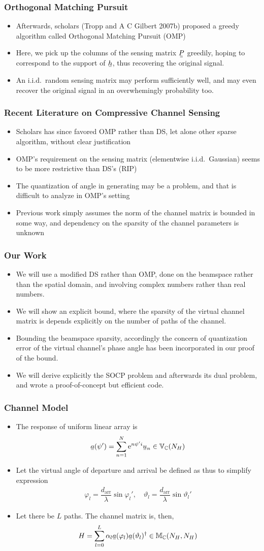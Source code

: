 \documentclass{beamer}
\newcommand{\Disp}[1]{\begin{align} #1 \end{align}}
\renewcommand{\H}{\dagger}
\newcommand{\f}{\varphi}
\renewcommand{\th}{\vartheta}
\newcommand{\I}{\item}
\newcommand{\MB}[1]{\mathbb{#1}}
\newcommand{\RM}[1]{\mathrm{#1}}
\newcommand{\V}[1]{\stackunder[1.2pt]{$#1$}{\rule{.9ex}{.075ex}}}
\newcommand{\M}[1]{\V{\V{#1}}}
\begin{document}
\begin{frame}
\frametitle{Orthogonal Matching Pursuit}
\begin{itemize}
\I Afterwards, scholars (Tropp and A C Gilbert 2007b) proposed a greedy algorithm called Orthogonal Matching Pursuit (OMP)
\I Here, we pick up the columns of the sensing matrix \(\M{P}\) greedily, hoping to correspond to the support of \(\V{h}\), thus recovering the original signal.
\I An i.i.d.\ random sensing matrix may perform sufficiently well, and may even recover the original signal in an overwhemingly probability too.
\end{itemize}
\end{frame}

\begin{frame}
\frametitle{Recent Literature on Compressive Channel Sensing}
\begin{itemize}
\I Scholars has since favored OMP rather than DS, let alone other sparse algorithm, without clear justification
\I OMP's requirement on the sensing matrix (elementwise i.i.d.\ Gaussian) seems to be more restrictive than DS's (RIP)
\I The quantization of angle in generating may be a problem, and that is difficult to analyze in OMP's setting
\I Previous work simply assumes the norm of the channel matrix is bounded in some way, and dependency on the sparsity of the channel parameters is unknown
\end{itemize}
\end{frame}

\begin{frame}
\frametitle{Our Work}
\begin{itemize}
\I We will use a modified DS rather than OMP, done on the beamspace rather than the spatial domain, and involving complex numbers rather than real numbers.
\I We will show an explicit bound, where the sparsity of the virtual channel matrix is depends explicitly on the number of paths of the channel.
\I Bounding the beamspace sparsity, accordingly the concern of quantization error of the virtual channel's phase angle has been incorporated in our proof of the bound.
\I We will derive explicitly the SOCP problem and afterwards its dual problem, and wrote a proof-of-concept but efficient code.
\end{itemize}
\end{frame}

\begin{frame}
\frametitle{Channel Model}
\begin{itemize}
\I The response of uniform linear array is
\Disp{
\V{a} (\psi')
=\sum_{n=1}^{N} \RM{e}^{n \psi' i} \V{u}_n
\in \MB{V}_\MB{C} (N_H)
}
\I Let the virtual angle of departure and arrival be defined as thus to simplify expression
\Disp{
\f_l =\dfrac{d_{\RM{arr}}} {\lambda} \sin \f_l', \quad \th_l =\dfrac{d_{\RM{arr}}} {\lambda} \sin \th_l'
}
\I Let there be \(L\) paths.
The channel matrix is, then,
\Disp{
H
=\sum_{l=0}^L \alpha_l \V{a} (\f_l) \V{a} (\th_l)^\H
\in \MB{M}_\MB{C} (N_H, N_H)
}
\end{itemize}
\end{frame}
\end{document}
